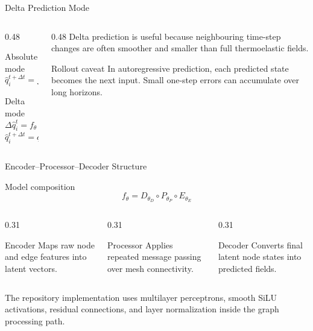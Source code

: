 \begin{frame}{Delta Prediction Mode}
  \begin{columns}[T]
    \begin{column}{0.48\textwidth}
      \begin{block}{Absolute mode}
        \[
          \hat{q}_i^{t+\Delta t}=f_{\theta}(x_i^t,\mathcal{G})
        \]
      \end{block}
      \begin{block}{Delta mode}
        \[
          \Delta\hat{q}_i^t=f_{\theta}(x_i^t,\mathcal{G})
        \]
        \[
          \hat{q}_i^{t+\Delta t}=q_i^t+\Delta\hat{q}_i^t
        \]
      \end{block}
    \end{column}
    \begin{column}{0.48\textwidth}
      \footnotesize
      Delta prediction is useful because neighbouring time-step changes are
      often smoother and smaller than full thermoelastic fields.
      \vskip 5pt
      \begin{alertblock}{Rollout caveat}
        \footnotesize
        In autoregressive prediction, each predicted state becomes the next
        input. Small one-step errors can accumulate over long horizons.
      \end{alertblock}
    \end{column}
  \end{columns}
\end{frame}

\begin{frame}{Encoder--Processor--Decoder Structure}
  \begin{block}{Model composition}
    \[
      f_{\theta}=D_{\theta_D}\circ P_{\theta_P}\circ E_{\theta_E}
    \]
  \end{block}
  \vskip 4pt
  \begin{columns}[T]
    \begin{column}{0.31\textwidth}
      \begin{block}{Encoder}
        \footnotesize
        Maps raw node and edge features into latent vectors.
      \end{block}
    \end{column}
    \begin{column}{0.31\textwidth}
      \begin{block}{Processor}
        \footnotesize
        Applies repeated message passing over mesh connectivity.
      \end{block}
    \end{column}
    \begin{column}{0.31\textwidth}
      \begin{block}{Decoder}
        \footnotesize
        Converts final latent node states into predicted fields.
      \end{block}
    \end{column}
  \end{columns}
  \vskip 4pt
  \scriptsize
  The repository implementation uses multilayer perceptrons, smooth SiLU
  activations, residual connections, and layer normalization inside the graph
  processing path.
\end{frame}

